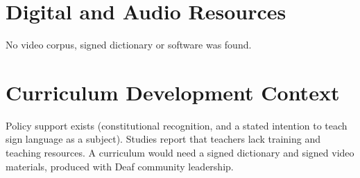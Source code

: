 \documentclass[12pt]{article}
\begin{document}
\section{Digital and Audio Resources}
No video corpus, signed dictionary or software was found.

\section{Curriculum Development Context}
Policy support exists (constitutional recognition, and a stated intention to teach sign language as a subject). Studies report that teachers lack training and teaching resources. A curriculum would need a signed dictionary and signed video materials, produced with Deaf community leadership.
\end{document}
